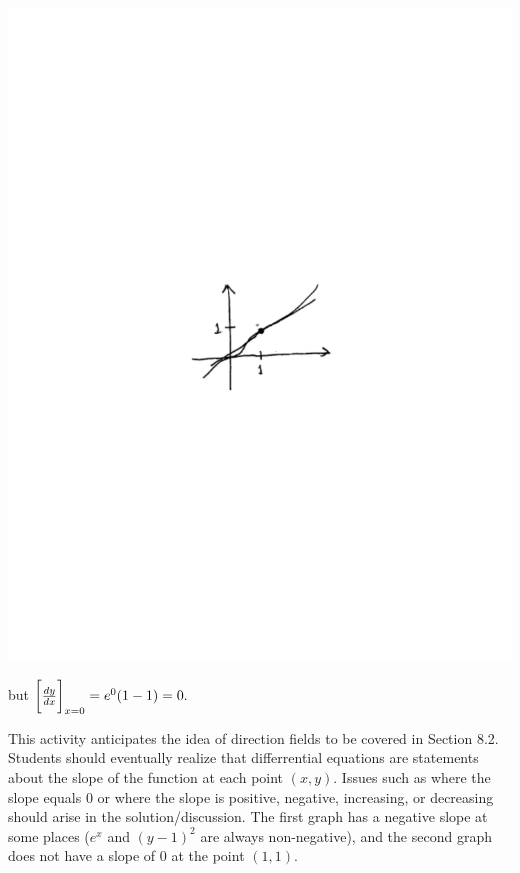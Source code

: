 \documentclass[]{ximera}
\begin{document}
\begin{problem}
\begin{freeResponse}
	\begin{image}
	\includegraphics[trim= 170 330 190 330, scale=1]{Figure8-1-3.pdf}	
	\end{image}
	
	but $\eval{\dd[y]{x}}_{x=0} = e^0(1-1) = 0.$
	\end{freeResponse}

\end{problem}

\begin{instructorNotes}
This activity anticipates the idea of direction fields to be covered in Section 8.2.  
Students should eventually realize that differrential equations are statements about the slope of the function at each point $(x,y)$.  
Issues such as where the slope equals $0$ or where the slope is positive, negative, increasing, or decreasing should arise in the solution/discussion.  
The first graph has a negative slope at some places ($e^x$ and $(y-1)^2$ are always non-negative), and the second graph does not have a slope of $0$ at the point $(1,1)$.  
\end{instructorNotes}
















	
	
	
	
	
	
	
	
	

	










								
				
				
	
\end{document}
